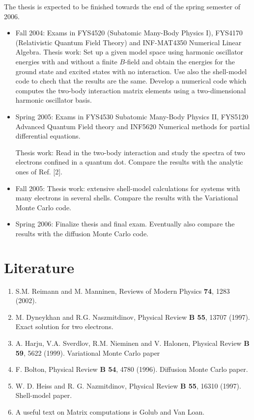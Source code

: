 The thesis is expected to be finished towards the end  of the spring
semester of 2006.
\begin{itemize}
\item Fall 2004: 
      Exams in FYS4520 (Subatomic Many-Body Physics I), FYS4170 (Relativistic Quantum Field Theory) and  INF-MAT4350	Numerical Linear Algebra.
Thesis work: Set up a given model space using harmonic oscillator energies with and without a finite $B$-field and obtain the energies for the ground state and
excited states with no interaction. Use also the shell-model code to chech that the results are the same.
Develop a numerical code which computes the two-body interaction matrix elements using a two-dimensional harmonic oscillator basis.
\item Spring 2005:  Exams in FYS4530	Subatomic Many-Body Physics II, FYS5120
Advanced Quantum Field theory and INF5620	Numerical methods for partial differential equations.

Thesis work: Read in the two-body interaction and study the spectra of 
two electrons confined in a quantum dot. Compare the results with the analytic ones of Ref. [2].
\item Fall 2005: Thesis work: extensive shell-model calculations for systems with many electrons in several shells. Compare the results with the Variational
Monte Carlo code. 
\item Spring 2006: Finalize thesis and final exam. Eventually also compare the results with the diffusion Monte Carlo code.
\end{itemize}

\section*{Literature}
\begin{enumerate}
\item S.M. Reimann and M. Manninen, Reviews of Modern Physics {\bf 74}, 1283 (2002).  
\item M. Dyneykhan and R.G. Naszmitdinov, Physical Review {\bf B 55}, 13707 (1997). Exact solution for two electrons.
\item A. Harju, V.A. Sverdlov, R.M. Nieminen and V. Halonen, Physical Review {\bf B 59}, 5622 (1999). Variational Monte Carlo paper
\item F. Bolton, Physical Review {\bf B 54}, 4780 (1996). Diffusion Monte Carlo paper.
\item W. D. Heiss and R. G. Nazmitdinov, Physical Review {\bf B 55}, 16310 (1997). Shell-model paper.
\item A useful text on Matrix computations is Golub and Van Loan.
\end{enumerate}


